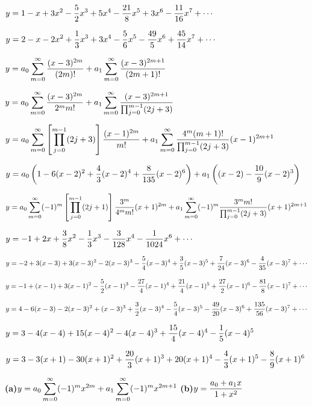$y=\displaystyle{1-x+3x^{2}-\frac{5}{2}x^{3}+5x^{4}-\frac{21}{8}x^{5}+3x^{6}
-\frac{11}{16}x^{7}+\cdots}$

$y=\displaystyle{2-x-2x^{2}+\frac{1}{3}x^{3}+3x^{4}-\frac{5}{6}x^{5}-\frac{49}{5}x^{6}
+\frac{45}{14}x^{7}+\cdots}$

$y=\displaystyle{a_{0}\sum_{m=0}^{\infty}\frac{(x-3)^{2m}}{(2m)!}+a_{1}\sum_{m=0}^{\infty}
\frac{(x-3)^{2m+1}}{(2m+1)!}}$

$y=\displaystyle{a_{0}\sum_{m=0}^{\infty}\frac{(x-3)^{2m}}{2^{m}m!}+a_{1}\sum_{m=0}^{\infty}
\frac{(x-3)^{2m+1}}{\prod_{j=0}^{m-1}(2j+3)}}$

$y=\displaystyle{a_{0}\sum_{m=0}^{\infty}\left[\prod_{j=0}^{m-1}(2j+3)\right]{\frac{(x-1)^{2m}}{m!}}+a_{1}\sum_{m=0}^{\infty}
\frac{4^{m}(m+1)!}{\prod_{j=0}^{m-1}(2j+3)}(x-1)^{2m+1}}$

$y=\displaystyle{a_{0}\left(1-6(x-2)^{2}+\frac{4}{3}(x-2)^{4}+\frac{8}{135}(x-2)^{6}\right)
+a_{1}\left((x-2)-\frac{10}{9}(x-2)^{3}\right)}$

$y=\displaystyle{a_{0}\sum_{m=0}^{\infty}(-1)^{m}\left[\prod_{j=0}^{m-1}(2j+1)\right]
{\frac{3^{m}}{4^{m}m!}}(x+1)^{2m}+a_{1}\sum_{m=0}^{\infty}(-1)^{m}\frac{3^{m}m!}{\prod_{j=0}^{m-1}(2j+3)}(x+1)^{2m+1}}$

$y=\displaystyle{-1+2x+\frac{3}{8}x^{2}-\frac{1}{3}x^{3}-\frac{3}{128}x^{4}-\frac{1}{1024}x^{6}+\cdots}$

$y=\displaystyle{-2+3(x-3)+3(x-3)^{2}-2(x-3)^{3}-\frac{5}{4}(x-3)^{4}+\frac{3}{5}(x-3)^{5}
+\frac{7}{24}(x-3)^{6}-\frac{4}{35}(x-3)^{7}+\cdots}$

$y=\displaystyle{-1+(x-1)+3(x-1)^{2}-\frac{5}{2}(x-1)^{3}-\frac{27}{4}(x-1)^{4}+\frac{21}{4}(x-1)^{5}
+\frac{27}{2}(x-1)^{6}-\frac{81}{8}(x-1)^{7}+\cdots}$

$y=\displaystyle{4-6(x-3)-2(x-3)^{2}+(x-3)^{3}+\frac{3}{2}(x-3)^{4}-\frac{5}{4}(x-3)^{5}-
\frac{49}{20}(x-3)^{6}+\frac{135}{56}(x-3)^{7}+\cdots}$

$y=\displaystyle{3-4(x-4)+15(x-4)^{2}-4(x-4)^{3}+\frac{15}{4}(x-4)^{4}-\frac{1}{5}(x-4)^{5}}$%

$y=\displaystyle{3-3(x+1)-30(x+1)^{2}+\frac{20}{3}(x+1)^{3}+20(x+1)^{4}-\frac{4}{3}(x+1)^{5}-\frac{8}{9}(x+1)^{6}}$  %

{\bf (a)}$y=\displaystyle{a_{0}\sum_{m=0}^{\infty}(-1)^{m}
x^{2m}+a_{1}\sum_{m=0}^{\infty}(-1)^{m}x^{2m+1}}$
{\bf (b)}$y=\displaystyle\frac{a_{0}+a_{1}x}{1+x^{2}}$

